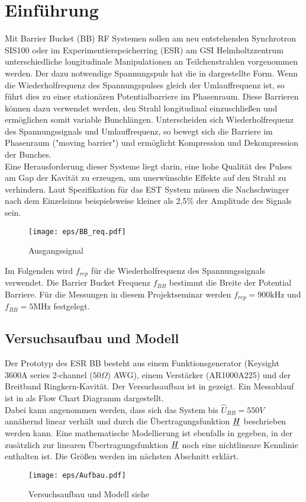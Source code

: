 \documentclass[../Report.tex]{subfiles}
\begin{document}
\chapter{Einführung}
\label{chap:einfuehrung}
Mit Barrier Bucket (BB) RF Systemen sollen am neu entstehenden Synchrotron SIS100 oder im Experimentier\-speicherring (ESR) am GSI Helmholtzzentrum unterschiedliche longitudinale Manipulationen an Teilchenstrahlen vorgenommen werden. Der dazu notwendige Spannungspuls hat die in  dargestellte Form. Wenn die Wiederholfrequenz des Spannungspulses gleich der Umlauffrequenz ist, so führt dies zu einer stationären Potentialbarriere im Phasenraum. Diese Barrieren können dazu verwendet werden, den Strahl longitudinal einzuschließen und ermöglichen somit variable Bunchlängen. Unterscheiden sich Wiederholfrequenz des Spannungssignals und Umlauffrequenz, so bewegt sich die Barriere im Phasenraum ("moving barrier") und ermöglicht Kompression und Dekompression der Bunches.
\\ 
Eine Herausforderung dieser Systeme liegt darin, eine hohe Qualität des Pulses am Gap der Kavität zu erzeugen, um unerwünschte Effekte auf den Strahl zu verhindern. Laut Spezifikation für das EST System müssen die Nachschwinger nach dem Einzelsinus beispielsweise kleiner als 2,5\% der Amplitude des Signals sein.
\begin{figure}[H]
  \centering
  \texttt{[image: eps/BB\_req.pdf]}
  \caption{Ausgangssignal}
  \label{fig:BB_req}
\end{figure}
\noindent
Im Folgenden wird $f_{rep}$ für die Wiederholfrequenz des Spannungssignals verwendet. Die Barrier Bucket Frequenz $f_{BB}$ bestimmt die Breite der Potential Barriere. Für die Messungen in diesem Projektseminar werden ${f_{rep} = 900 \si{\kilo \hertz}}$ und ${f_{BB} = 5 \si{\mega \hertz}}$ festgelegt.


\section[Modell und Konvention]{Versuchsaufbau und Modell}
\label{sec:einf.modell_BB}
Der Prototyp des ESR BB besteht aus einem Funktionsgenerator (Keysight 3600A series 2-channel ($50\Omega $) AWG), einem Verstärker (AR1000A225) und der Breitband Ringkern-Kavität. Der Versuchsaufbau ist in  gezeigt. Ein Messablauf ist in  als Flow Chart Diagramm dargestellt.\\
Dabei kann angenommen werden, dass sich das System bis $\hat{U}_{BB} = 550V$ annähernd linear verhält und durch die Übertragungsfunktion $\underline{H}$ beschrieben werden kann. Eine mathematische Modellierung ist ebenfalls in  gegeben, in der zusätzlich zur linearen Übertragungsfunktion $\underline{H}$ noch eine nichtlineare Kennlinie enthalten ist. Die Größen werden im nächsten Abschnitt erklärt.
\begin{figure}[H]
	\centering
	\texttt{[image: eps/Aufbau.pdf]}
	\caption{Versuchsaufbau und Modell siehe \cite{harzheim}}
  	\label{fig:Aufbau}
\end{figure}
\end{document}
